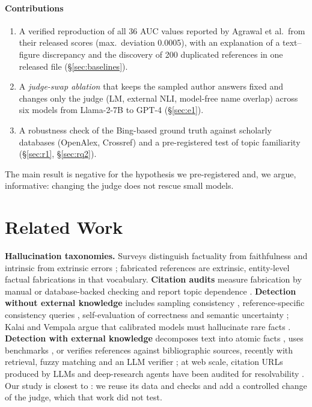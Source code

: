 \documentclass[acmsmall,screen]{acmart}
\begin{document}
\paragraph{Contributions}
\begin{enumerate}[leftmargin=*]
  \item A verified reproduction of all 36 AUC values reported by Agrawal et al.\ from their released scores (max.\ deviation 0.0005), with an explanation of a text--figure discrepancy and the discovery of 200 duplicated references in one released file (\S\ref{sec:baselines}).
  \item A \emph{judge-swap ablation} that keeps the sampled author answers fixed and changes only the judge (LM, external NLI, model-free name overlap) across six models from Llama-2-7B to GPT-4 (\S\ref{sec:e1}).
  \item A robustness check of the Bing-based ground truth against scholarly databases (OpenAlex, Crossref) and a pre-registered test of topic familiarity (\S\ref{sec:r1}, \S\ref{sec:rq2}).
\end{enumerate}
The main result is negative for the hypothesis we pre-registered and, we argue, informative: changing the judge does not rescue small models.

\section{Related Work}\label{sec:related}
\textbf{Hallucination taxonomies.} Surveys distinguish factuality from faithfulness and intrinsic from extrinsic errors \cite{ji2023survey,huang2025survey}; fabricated references are extrinsic, entity-level factual fabrications in that vocabulary. \textbf{Citation audits} measure fabrication by manual or database-backed checking \cite{walters2023fabrication,bhattacharyya2023high,chelli2024hallucination} and report topic dependence \cite{linardon2025topic}. \textbf{Detection without external knowledge} includes sampling consistency \cite{manakul2023selfcheck}, reference-specific consistency queries \cite{agrawal2023hallucinating}, self-evaluation of correctness \cite{kadavath2022knowledge} and semantic uncertainty \cite{kuhn2023semantic}; Kalai and Vempala argue that calibrated models must hallucinate rare facts \cite{kalai2024calibrated}. \textbf{Detection with external knowledge} decomposes text into atomic facts \cite{min2023factscore}, uses benchmarks \cite{li2023halueval,niu2024ragtruth}, or verifies references against bibliographic sources, recently with retrieval, fuzzy matching and an LLM verifier \cite{misra2026detecting}; at web scale, citation URLs produced by LLMs and deep-research agents have been audited for resolvability \cite{rao2026detecting}. Our study is closest to \cite{agrawal2023hallucinating}: we reuse its data and checks and add a controlled change of the judge, which that work did not test.
\end{document}
